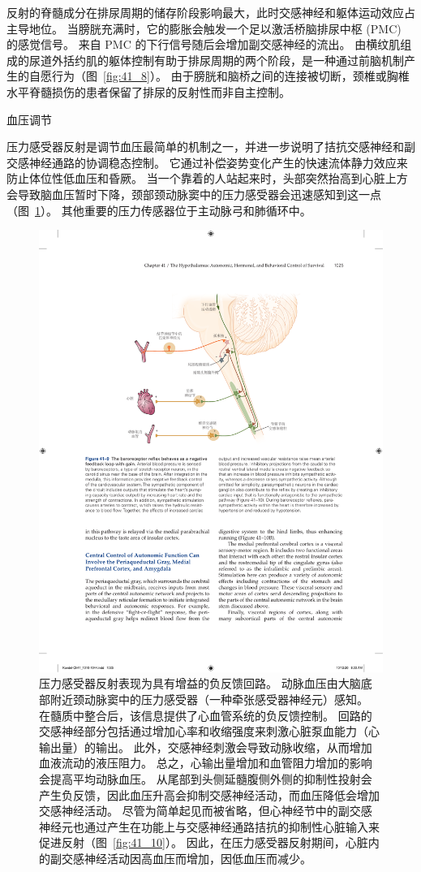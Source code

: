 反射的脊髓成分在排尿周期的储存阶段影响最大，此时交感神经和躯体运动效应占主导地位。
当膀胱充满时，它的膨胀会触发一个足以激活桥脑排尿中枢 (PMC) 的感觉信号。
来自 PMC 的下行信号随后会增加副交感神经的流出。
由横纹肌组成的尿道外括约肌的躯体控制有助于排尿周期的两个阶段，是一种通过前脑机制产生的自愿行为（图~\ref{fig:41_8}）。
由于膀胱和脑桥之间的连接被切断，颈椎或胸椎水平脊髓损伤的患者保留了排尿的反射性而非自主控制。


血压调节

压力感受器反射是调节血压最简单的机制之一，并进一步说明了拮抗交感神经和副交感神经通路的协调稳态控制。
它通过补偿姿势变化产生的快速流体静力效应来防止体位性低血压和昏厥。
当一个靠着的人站起来时，头部突然抬高到心脏上方会导致脑血压暂时下降，颈部颈动脉窦中的压力感受器会迅速感知到这一点（图~\ref{fig:41_9}）。
其他重要的压力传感器位于主动脉弓和肺循环中。


\begin{figure}[htbp]
	\centering
	\includegraphics[width=0.7\linewidth]{chap41/fig_41_9}
	\caption{压力感受器反射表现为具有增益的负反馈回路。
		动脉血压由大脑底部附近颈动脉窦中的压力感受器（一种牵张感受器神经元）感知。
		在髓质中整合后，该信息提供了心血管系统的负反馈控制。
		回路的交感神经部分包括通过增加心率和收缩强度来刺激心脏泵血能力（心输出量）的输出。
		此外，交感神经刺激会导致动脉收缩，从而增加血液流动的液压阻力。
		总之，心输出量增加和血管阻力增加的影响会提高平均动脉血压。
		从尾部到头侧延髓腹侧外侧的抑制性投射会产生负反馈，因此血压升高会抑制交感神经活动，而血压降低会增加交感神经活动。
		尽管为简单起见而被省略，但心神经节中的副交感神经元也通过产生在功能上与交感神经通路拮抗的抑制性心脏输入来促进反射（图~\ref{fig:41_10}）。
		因此，在压力感受器反射期间，心脏内的副交感神经活动因高血压而增加，因低血压而减少。}
	\label{fig:41_9}
\end{figure}



